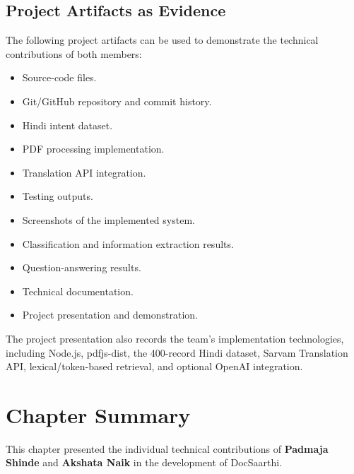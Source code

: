 \subsection{Project Artifacts as Evidence}

The following project artifacts can be used to demonstrate the
technical contributions of both members:

\begin{itemize}

    \item Source-code files.

    \item Git/GitHub repository and commit history.

    \item Hindi intent dataset.

    \item PDF processing implementation.

    \item Translation API integration.

    \item Testing outputs.

    \item Screenshots of the implemented system.

    \item Classification and information extraction results.

    \item Question-answering results.

    \item Technical documentation.

    \item Project presentation and demonstration.

\end{itemize}

The project presentation also records the team's implementation
technologies, including Node.js, pdfjs-dist, the 400-record Hindi
dataset, Sarvam Translation API, lexical/token-based retrieval, and
optional OpenAI integration.

\section*{Chapter Summary}

This chapter presented the individual technical contributions of
\textbf{Padmaja Shinde} and \textbf{Akshata Naik} in the development
of DocSaarthi.

